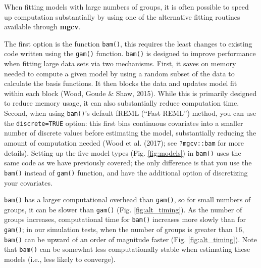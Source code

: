 \documentclass[12pt]{article}
\begin{document}
When fitting models with large numbers of groups, it is often possible
to speed up computation substantially by using one of the alternative
fitting routines available through \textbf{mgcv}.

The first option is the function \texttt{bam()}, this requires the least
changes to existing code written using the \texttt{gam()} function.
\texttt{bam()} is designed to improve performance when fitting large
data sets via two mechanisms. First, it saves on memory needed to
compute a given model by using a random subset of the data to calculate
the basis functions. It then blocks the data and updates model fit
within each block (Wood, Goude \& Shaw, 2015). While this is primarily
designed to reduce memory usage, it can also substantially reduce
computation time. Second, when using \texttt{bam()}'s default fREML
(``Fast REML'') method, you can use the \texttt{discrete=TRUE} option:
this first bins continuous covariates into a smaller number of discrete
values before estimating the model, substantially reducing the amount of
computation needed (Wood et al. (2017); see \texttt{?mgcv::bam} for more
details). Setting up the five model types (Fig. \ref{fig:models}) in
\texttt{bam()} uses the same code as we have previously covered; the
only difference is that you use the \texttt{bam()} instead of
\texttt{gam()} function, and have the additional option of discretizing
your covariates.

\texttt{bam()} has a larger computational overhead than \texttt{gam()},
so for small numbers of groups, it can be slower than \texttt{gam()}
(Fig. \ref{fig:alt_timing}). As the number of groups increases,
computational time for \texttt{bam()} increases more slowly than for
\texttt{gam()}; in our simulation tests, when the number of groups is
greater than 16, \texttt{bam()} can be upward of an order of magnitude
faster (Fig. \ref{fig:alt_timing}). Note that \texttt{bam()} can be
somewhat less computationally stable when estimating these models (i.e.,
less likely to converge).
\end{document}

